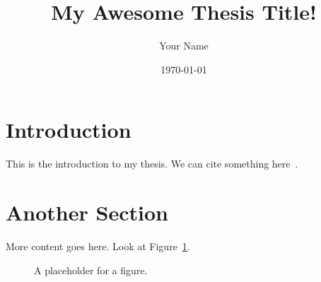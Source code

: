\documentclass{article} %
\title{My Awesome Thesis Title!}
\author{Your Name}
\date{\today}
\begin{document}
\maketitle

\section{Introduction}
This is the introduction to my thesis.
We can cite something here~\cite{example_key}.

\section{Another Section}
More content goes here.
Look at Figure~\ref{fig:myfigure}.

\begin{figure}[htbp]
    \centering
    \caption{A placeholder for a figure.}
    \label{fig:myfigure}
\end{figure}

\printbibliography
\end{document}
